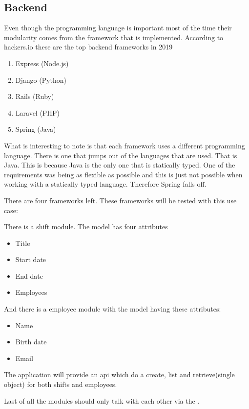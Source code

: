 \subsection{Backend}
\label{sec:BackendImplementation}

Even though the programming language is important most of the time their modularity comes from the framework that is implemented. According to hackers.io these are the top backend frameworks in 2019 \cite{topFrameworks}

\begin{enumerate}
    \item Express (Node.js)
    \item Django (Python)
    \item Rails (Ruby)
    \item Laravel (PHP)
    \item Spring (Java)
\end{enumerate}

What is interesting to note is that each framework uses a different programming language. There is one that jumps out of the languages that are used. That is Java. This is because Java is the only one that is statically typed. One of the requirements was being as flexible as possible and this is just not possible when working with a statically typed language. Therefore Spring falls off.

There are four frameworks left. These frameworks will be tested with this use case:

There is a shift module. The model has four attributes
\begin{itemize}
    \item Title
    \item Start date
    \item End date
    \item Employees
\end{itemize}

And there is a employee module with the model having these attributes:
\begin{itemize}
    \item Name
    \item Birth date
    \item Email
\end{itemize}

The application will provide an api which do a create, list and retrieve(single object) for both shifts and employees.

Last of all the modules should only talk with each other via the .


